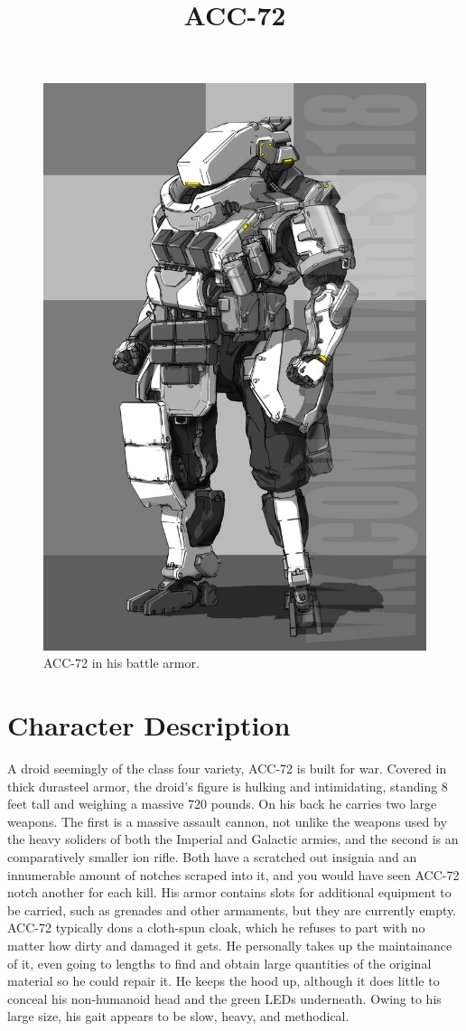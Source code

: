 \documentclass[12pt]{article}
\begin{document}
 
\title{ACC-72}
\date{}

\maketitle

\begin{figure}[!htb]
  \centering
  \includegraphics[width=.68\textwidth]{./resources/acc72}
  \caption{ACC-72 in his battle armor.}
\end{figure}

\section{Character Description}

A droid seemingly of the class four variety, ACC-72 is built for war. 
Covered in thick durasteel armor, the droid's figure is hulking and
intimidating, standing 8 feet tall and weighing a massive 720 pounds. 
On his back he carries two large weapons. 
The first is a massive assault cannon, not unlike the weapons used by the heavy
soliders of both the Imperial and Galactic armies, and the second is an
comparatively smaller ion rifle. 
Both have a scratched out insignia and an innumerable amount of notches scraped
into it, and you would have seen ACC-72 notch another for each kill. 
His armor contains slots for additional equipment to be carried, such as
grenades and other armaments, but they are currently empty. 
ACC-72 typically dons a cloth-spun cloak, which he refuses to part with no
matter how dirty and damaged it gets. 
He personally takes up the maintainance of it, even going to lengths to find
and obtain large quantities of the original material so he could repair it.
He keeps the hood up, although it does little to conceal his non-humanoid head
and the green LEDs underneath. 
Owing to his large size, his gait appears to be slow, heavy, and methodical. 
\end{document}
